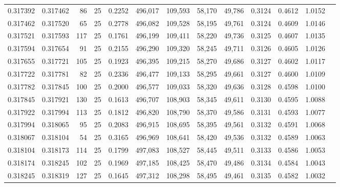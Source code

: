 \begin{tabular}{rrrrrrrrrrrrr}
0.317392 & 0.317462 &    86 &  25 &                                     0.2252 & 496,017 & 109,593 &  58,170 &  49,786 & 0.3124 & 0.4612 & 1.0152 \\
0.317462 & 0.317520 &    65 &  25 &                                     0.2778 & 496,082 & 109,528 &  58,195 &  49,761 & 0.3124 & 0.4609 & 1.0146 \\
0.317521 & 0.317593 &   117 &  25 &                                     0.1761 & 496,199 & 109,411 &  58,220 &  49,736 & 0.3125 & 0.4607 & 1.0135 \\
0.317594 & 0.317654 &    91 &  25 &                                     0.2155 & 496,290 & 109,320 &  58,245 &  49,711 & 0.3126 & 0.4605 & 1.0126 \\
0.317655 & 0.317721 &   105 &  25 &                                     0.1923 & 496,395 & 109,215 &  58,270 &  49,686 & 0.3127 & 0.4602 & 1.0117 \\
0.317722 & 0.317781 &    82 &  25 &                                     0.2336 & 496,477 & 109,133 &  58,295 &  49,661 & 0.3127 & 0.4600 & 1.0109 \\
0.317782 & 0.317845 &   100 &  25 &                                     0.2000 & 496,577 & 109,033 &  58,320 &  49,636 & 0.3128 & 0.4598 & 1.0100 \\
0.317845 & 0.317921 &   130 &  25 &                                     0.1613 & 496,707 & 108,903 &  58,345 &  49,611 & 0.3130 & 0.4595 & 1.0088 \\
0.317922 & 0.317994 &   113 &  25 &                                     0.1812 & 496,820 & 108,790 &  58,370 &  49,586 & 0.3131 & 0.4593 & 1.0077 \\
0.317994 & 0.318065 &    95 &  25 &                                     0.2083 & 496,915 & 108,695 &  58,395 &  49,561 & 0.3132 & 0.4591 & 1.0068 \\
0.318067 & 0.318104 &    54 &  25 &                                     0.3165 & 496,969 & 108,641 &  58,420 &  49,536 & 0.3132 & 0.4589 & 1.0063 \\
0.318104 & 0.318173 &   114 &  25 &                                     0.1799 & 497,083 & 108,527 &  58,445 &  49,511 & 0.3133 & 0.4586 & 1.0053 \\
0.318174 & 0.318245 &   102 &  25 &                                     0.1969 & 497,185 & 108,425 &  58,470 &  49,486 & 0.3134 & 0.4584 & 1.0043 \\
0.318245 & 0.318319 &   127 &  25 &                                     0.1645 & 497,312 & 108,298 &  58,495 &  49,461 & 0.3135 & 0.4582 & 1.0032 \\

\end{tabular}
